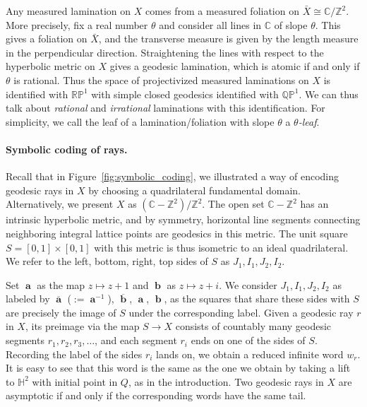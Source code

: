 \documentclass[11pt]{article} %
\theoremstyle{plain}
\theoremstyle{definition}
\DeclareMathOperator{\bolda}{\mathbf{a}}
\DeclareMathOperator{\boldb}{\mathbf{b}}
\numberwithin{equation}{section}
\begin{document}
Any measured lamination on $X$ comes from a measured foliation on $\bar{X}\cong\mathbb{C}/\mathbb{Z}^2$. More precisely, fix a real number $\theta$ and consider all lines in $\mathbb{C}$ of slope $\theta$. This gives a foliation on $\bar{X}$, and the transverse measure is given by the length measure in the perpendicular direction. Straightening the lines with respect to the hyperbolic metric on $X$ gives a geodesic lamination, which is atomic if and only if $\theta$ is rational. Thus the space of projectivized measured laminations on $X$ is identified with $\mathbb{RP}^1$ with simple closed geodesics identified with $\mathbb{QP}^1$. We can thus talk about \emph{rational} and \emph{irrational} laminations with this identification. For simplicity, we call the leaf of a lamination/foliation with slope $\theta$ a \emph{$\theta$-leaf}.

\paragraph{Symbolic coding of rays.}
Recall that in Figure~\ref{fig:symbolic_coding}, we illustrated a way of encoding geodesic rays in $X$ by choosing a quadrilateral fundamental domain. Alternatively, we present $X$ as $(\mathbb{C}-\mathbb{Z}^2)/\mathbb{Z}^2$. The open set $\mathbb{C}-\mathbb{Z}^2$ has an intrinsic hyperbolic metric, and by symmetry, horizontal line segments connecting neighboring integral lattice points are geodesics in this metric. The unit square $S=[0,1]\times[0,1]$ with this metric is thus isometric to an ideal quadrilateral. We refer to the left, bottom, right, top sides of $S$ as $J_1,I_1,J_2,I_2$.

Set $\bolda$ as the map $z\mapsto z+1$ and $\boldb$ as $z\mapsto z+i$. We consider $J_1,I_1,J_2,I_2$ as labeled by $\overline{\bolda}$ ($:=\bolda^{-1}$), $\overline{\boldb}$, $\bolda$, $\boldb$, as the squares that share these sides with $S$ are precisely the image of $S$ under the corresponding label. Given a geodesic ray $r$ in $X$, its preimage via the map $S\to X$ consists of countably many geodesic segments $r_1,r_2,r_3,\ldots$, and each segment $r_i$ ends on one of the sides of $S$. Recording the label of the sides $r_i$ lands on, we obtain a reduced infinite word $w_r$. It is easy to see that this word is the same as the one we obtain by taking a lift to $\mathbb{H}^2$ with initial point in $Q$, as in the introduction. Two geodesic rays in $X$ are asymptotic if and only if the corresponding words have the same tail.
\end{document}
